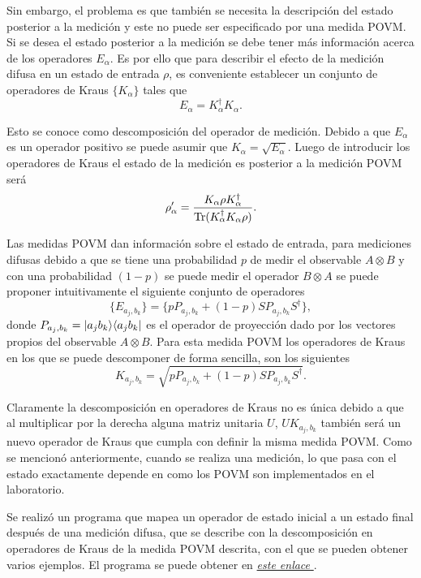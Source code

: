 Sin embargo, el problema es que también se necesita la descripción del estado posterior a la medición y este no puede ser especificado por una medida POVM\@. Si se desea el estado posterior a la medición se debe tener más información acerca de los operadores $E_\alpha$. Es por ello que para describir el efecto de la medición difusa en un estado de entrada $\rho$, es conveniente establecer un conjunto de operadores de Kraus $\{K_\alpha\}$ tales que \begin{equation}E_\alpha=K_\alpha^\dagger K_\alpha.\end{equation}

Esto se conoce como descomposición del operador de medición. Debido a que $E_\alpha$ es un operador positivo se puede asumir que $K_\alpha=\sqrt{E_\alpha}$. Luego de introducir los operadores de Kraus el estado de la medición es posterior a la medición POVM será \begin{equation}\rho'_\alpha=\dfrac{K_\alpha \rho K_\alpha^\dagger}{{\rm Tr}(K_\alpha^\dagger K_\alpha \rho)}.\end{equation}

Las medidas POVM dan información sobre el estado de entrada, para mediciones difusas debido a que se tiene una probabilidad $p$ de medir el observable $A\otimes B$ y con una probabilidad $(1-p)$ se puede medir el operador $B\otimes A$ se puede proponer intuitivamente el siguiente conjunto de operadores \begin{equation}\{E_{a_j, b_k}\}= \{p P_{a_j,b_k}+(1-p)SP_{a_j,b_k}S^\dagger\},\end{equation} donde $P_{a_j,b_k} = |a_j b_k\rangle \langle a_j b_k|$ es el operador de proyección dado por los vectores propios del observable $A\otimes B$. Para esta medida POVM los operadores de Kraus en los que se puede descomponer de forma sencilla, son los siguientes \begin{equation}
K_{a_j, b_k}= \sqrt{p P_{a_j,b_k}+(1-p)SP_{a_j,b_k}S^\dagger}.
\end{equation}

Claramente la descomposición en operadores de Kraus no es única debido a que al multiplicar por la derecha alguna matriz unitaria $U$, $UK_{a_j,b_k}$ también será un nuevo operador de Kraus que cumpla con definir la misma medida POVM\@. Como se mencionó anteriormente, cuando se realiza una medición, lo que pasa con el estado exactamente depende en como los POVM son implementados en el laboratorio.

Se realizó un programa que mapea un operador de estado inicial a un estado final después de una medición difusa, que se describe con la descomposición en operadores de Kraus de la medida POVM descrita, con el que se pueden obtener varios ejemplos. El programa se puede obtener en \href{https://github.com/Mohs9/Practicas_Tesis/blob/d751cf4a3b187f124057c927433b29aa6d918ef1/InformeFinal/Code/POVM.nb}{\textit{este enlace}
}.

